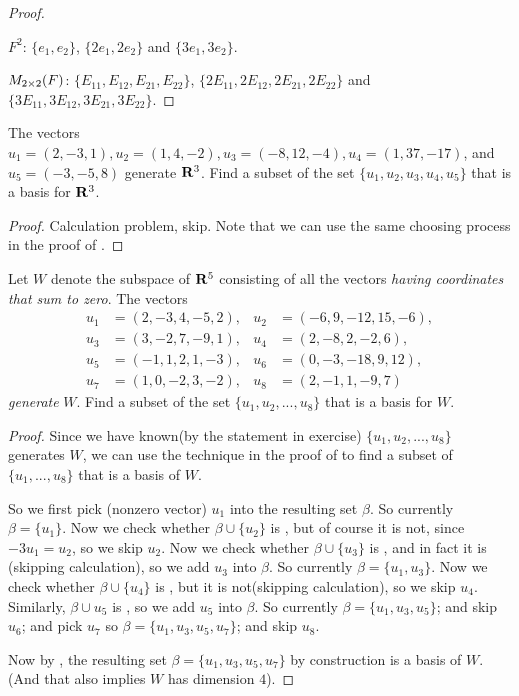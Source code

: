\begin{proof}\ 

\(F^2\): \(\{ e_1, e_2 \}\), \(\{ 2 e_1, 2 e_2 \}\) and \(\{ 3 e_1, 3 e_2 \}\).

\(M_{2 \times 2}(F)\): \(\{ E_{11}, E_{12}, E_{21}, E_{22} \}\), \(\{ 2 E_{11}, 2 E_{12}, 2 E_{21}, 2 E_{22} \}\) and \(\{ 3 E_{11}, 3 E_{12}, 3 E_{21}, 3 E_{22} \}\).
\end{proof}

\begin{exercise} \label{exercise 1.6.7}
The vectors \(u_1 = (2, -3, 1), u_2 = (1, 4, -2), u_3 = (-8, 12, -4), u_4 = (1, 37, -17)\), and \(u_5 = (-3, -5, 8)\) generate \(\mathbf{R}^3\).
Find a subset of the set \(\{ u_1, u_2, u_3, u_4, u_5 \}\) that is a basis for \(\mathbf{R}^3\).
\end{exercise}

\begin{proof}
Calculation problem, skip.
Note that we can use the same choosing process in the proof of .
\end{proof}

\begin{exercise} \label{exercise 1.6.8}
Let \(W\) denote the subspace of \(\mathbf{R}^5\) consisting of all the vectors \emph{having coordinates that sum to zero}.
The vectors
\begin{align*}
    u_1 & = (2, -3, 4, -5, 2), & u_2 & = (-6, 9, - 12, 15, -6), \\
    u_3 & = (3, -2, 7, -9, 1), & u_4 & = (2, -8, 2, -2, 6), \\
    u_5 & = (-1, 1, 2, 1, -3), & u_6 & = (0, -3, -18, 9, 12) , \\
    u_7 & = (1, 0, -2, 3, -2), & u_8 & = (2, -1, 1, -9, 7)
\end{align*}
\emph{generate} \(W\).
Find a subset of the set \(\{ u_1, u_2, ..., u_8 \}\) that is a basis for \(W\).
\end{exercise}

\begin{proof}
Since we have known(by the statement in exercise) \(\{ u_1, u_2, ..., u_8 \}\) generates \(W\), we can use the technique in the proof of  to find a subset of \(\{ u_1, ..., u_8 \}\) that is a basis of \(W\).

So we first pick (nonzero vector) \(u_1\) into the resulting set \(\beta\).
So currently \(\beta = \{ u_1 \}\).
Now we check whether \(\beta \cup \{u_2\}\) is \LID{}, but of course it is not, since \(-3u_1 = u_2\), so we skip \(u_2\).
Now we check whether \(\beta \cup \{u_3\}\) is \LID{}, and in fact it is (skipping calculation), so we add \(u_3\) into \(\beta\).
So currently \(\beta = \{ u_1, u_3 \}\).
Now we check whether \(\beta \cup \{u_4\}\) is \LID{}, but it is not(skipping calculation), so we skip \(u_4\).
Similarly, \(\beta \cup u_5\) is \LID{}, so we add \(u_5\) into \(\beta\).
So currently \(\beta = \{ u_1, u_3, u_5 \}\);
and skip \(u_6\);
and pick \(u_7\) so \(\beta = \{ u_1, u_3, u_5, u_7 \}\);
and skip \(u_8\).

Now by , the resulting set \(\beta = \{ u_1, u_3, u_5, u_7 \}\) by construction is a basis of \(W\).
(And that also implies \(W\) has dimension \(4\)).
\end{proof}

